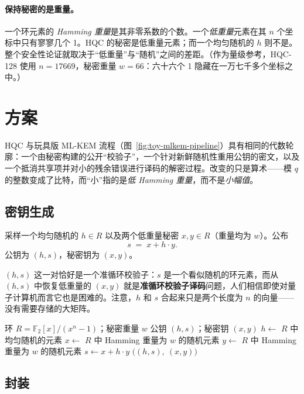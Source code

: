 \paragraph{保持秘密的是重量。}一个环元素的 \emph{Hamming 重量}是其非零系数的个数。一个\emph{低重量}元素在其 $n$ 个坐标中只有寥寥几个 1。HQC 的秘密是低重量元素；而一个均匀随机的 $h$ 则不是。整个安全性论证就取决于“低重量”与“随机”之间的差距。（作为量级参考，HQC-128 使用 $n = 17669$，秘密重量 $w = 66$：六十六个 1 隐藏在一万七千多个坐标之中。）

\section{方案}

HQC 与玩具版 ML-KEM 流程（图~\ref{fig:toy-mlkem-pipeline}）具有相同的代数轮廓：一个由秘密构建的公开“校验子”，一个针对新鲜随机性重用公钥的密文，以及一个抵消共享项并对小的残余错误进行译码的解密过程。改变的只是算术——模 $q$ 的整数变成了比特，而“小”指的是\emph{低 Hamming 重量}，而不是\emph{小幅值}。

\subsection{密钥生成}

采样一个均匀随机的 $h \in R$ 以及两个低重量秘密 $x, y \in R$（重量均为 $w$）。公布
\[
s \;=\; x + h\cdot y .
\]
公钥为 $(h, s)$，秘密钥为 $(x, y)$。

$(h, s)$ 这一对恰好是一个准循环校验子：$s$ 是一个看似随机的环元素，而从 $(h, s)$ 中恢复低重量的 $(x, y)$ 就是\textbf{准循环校验子译码}问题，人们相信即使对量子计算机而言它也是困难的。注意，$h$ 和 $s$ 合起来只是两个长度为 $n$ 的向量——没有需要存储的大矩阵。

\begin{algorithm}[H]
\caption{HQC KeyGen（教学形式）}
\label{alg:hqc-keygen}
\begin{algorithmic}[1]
\Require 环 $R=\mathbb{F}_2[x]/(x^n-1)$；秘密重量 $w$
\Ensure 公钥 $(h,s)$；秘密钥 $(x,y)$
\State $h \gets$ $R$ 中均匀随机的元素
\State $x \gets$ $R$ 中 Hamming 重量为 $w$ 的随机元素
\State $y \gets$ $R$ 中 Hamming 重量为 $w$ 的随机元素
\State $s \gets x + h\cdot y$ 
\State \Return $\big((h,s),\ (x,y)\big)$
\end{algorithmic}
\end{algorithm}

\subsection{封装}

